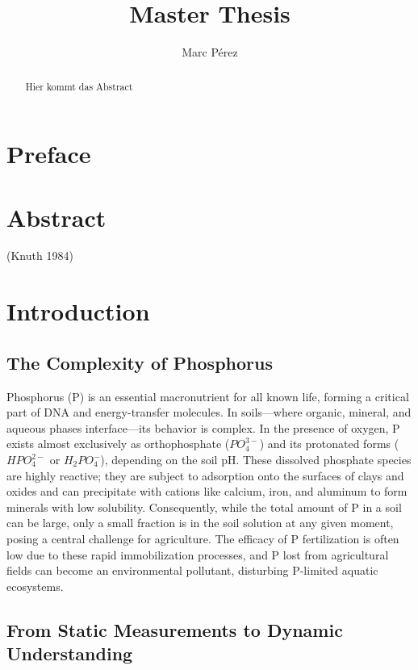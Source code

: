 \documentclass[
  letterpaper,
  DIV=11,
  numbers=noendperiod]{scrartcl}
\title{Master Thesis}
\author{Marc Pérez}
\date{}
\begin{document}
\maketitle
\begin{abstract}
Hier kommt das Abstract
\end{abstract}


\section{Preface}\label{preface}

\section{Abstract}\label{abstract}

(Knuth 1984)

\section{Introduction}\label{introduction}

\subsection{The Complexity of
Phosphorus}\label{the-complexity-of-phosphorus}

Phosphorus (P) is an essential macronutrient for all known life, forming
a critical part of DNA and energy-transfer molecules. In soils---where
organic, mineral, and aqueous phases interface---its behavior is
complex. In the presence of oxygen, P exists almost exclusively as
orthophosphate (\(PO_4^{3-}\)) and its protonated forms (\(HPO_4^{2-}\)
or \(H_2PO_4^{-}\)), depending on the soil pH. These dissolved phosphate
species are highly reactive; they are subject to adsorption onto the
surfaces of clays and oxides and can precipitate with cations like
calcium, iron, and aluminum to form minerals with low solubility.
Consequently, while the total amount of P in a soil can be large, only a
small fraction is in the soil solution at any given moment, posing a
central challenge for agriculture. The efficacy of P fertilization is
often low due to these rapid immobilization processes, and P lost from
agricultural fields can become an environmental pollutant, disturbing
P-limited aquatic ecosystems.

\subsection{From Static Measurements to Dynamic
Understanding}\label{from-static-measurements-to-dynamic-understanding}
\end{document}
